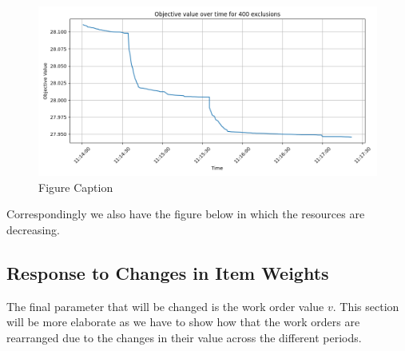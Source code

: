 \documentclass[preprint,12pt,authoryear]{elsarticle}
\begin{document}
\begin{figure}[H]%
\centering%
\includegraphics[width=1.0\textwidth]{figures/objective-resource-increases.png}
\caption{Figure Caption}\label{fig:objective-resource-increases}
\end{figure}

Correspondingly we also have the figure below in which the resources are decreasing.

\subsection{Response to Changes in Item Weights}
The final parameter that will be changed is the work order value $v$. This section will be more elaborate as we have to show how that the
work orders are rearranged due to the changes in their value across the different periods.
\end{document}
